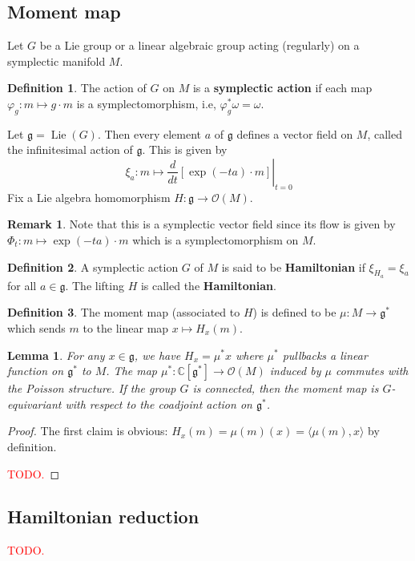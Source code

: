 \documentclass[12pt]{report}
\newtheorem{lemma}{Lemma}[section]
\theoremstyle{remark}
\theoremstyle{definition}
\newtheorem{remark}{Remark}[section]
\newtheorem{definition}{Definition}[section]
\newcommand{\w}[0]{\omega}
\newcommand{\C}[0]{\mathbb{C}}
\newcommand{\Lie}{\operatorname{Lie}}
\begin{document}
    \subsection{Moment map}
    Let $G$ be a Lie group or a linear algebraic group acting (regularly) on a symplectic manifold $M$.
    \begin{definition}
        The action of $G$ on $M$ is a \textbf{symplectic action} if each map $\varphi_g:m\mapsto g\cdot m$ is a symplectomorphism, i.e, $\varphi_g^*\w=\w$.
    \end{definition}
    Let $\mathfrak g=\Lie(G)$. Then every element $a$ of $\mathfrak g$ defines a vector field on $M$, called the infinitesimal action of $\mathfrak g$. This is given by 
    \[\xi_a:m\mapsto \left.\frac{d}{dt}[\exp(-ta)\cdot m]\right|_{t=0}\]
    Fix a Lie algebra homomorphism $H:\mathfrak g\to \mathcal O(M)$.
    \begin{remark}
        Note that this is a symplectic vector field since its flow is given by $\Phi_t:m\mapsto \exp(-ta)\cdot m$ which is a symplectomorphism on $M$.
    \end{remark}
    \begin{definition}
        A symplectic action $G$ of $M$ is said to be \textbf{Hamiltonian} if $\xi_{H_a}=\xi_a$ for all $a\in\mathfrak g$. The lifting $H$ is called the \textbf{Hamiltonian}.
    \end{definition}
    \begin{definition}
        The moment map (associated to $H$) is defined to be $\mu:M\to \mathfrak g^*$ which sends $m$ to the linear map $x\mapsto H_x(m)$.
    \end{definition}
    \begin{lemma}
        For any $x\in\mathfrak g$, we have $H_x=\mu^*x$ where $\mu^*$ pullbacks a linear function on $\mathfrak g^*$ to $M$. The map $\mu^*:\C[\mathfrak g^*]\to \mathcal O(M)$ induced by $\mu$ commutes with the Poisson structure. If the group $G$ is connected, then the moment map is $G$-equivariant with respect to the coadjoint action on $\mathfrak g^*$.
    \end{lemma}
    \begin{proof}
        The first claim is obvious: $H_x(m)=\mu(m)(x)=\langle\mu(m),x\rangle$ by definition.

        \textcolor{red}{TODO.}
    \end{proof}
    \subsection{Hamiltonian reduction}
    \textcolor{red}{TODO.}
\end{document}
